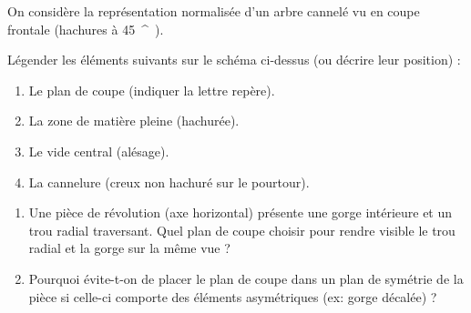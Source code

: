 \documentclass[11pt]{article}
\providecommand{\degree}{^{\circ}}
\begin{document}
\begin{exercice}
\begin{minipage}{\linewidth}
On considère la représentation normalisée d'un arbre cannelé vu en coupe frontale (hachures à \SI{45}{\degree}).
\begin{center}
\end{center}
Légender les éléments suivants sur le schéma ci-dessus (ou décrire leur position) :
\begin{enumerate}
    \item Le plan de coupe (indiquer la lettre repère).
    \item La zone de matière pleine (hachurée).
    \item Le vide central (alésage).
    \item La cannelure (creux non hachuré sur le pourtour).
\end{enumerate}
\end{minipage}
\end{exercice}

\begin{exercice}
\begin{enumerate}
    \item Une pièce de révolution (axe horizontal) présente une gorge intérieure et un trou radial traversant. Quel plan de coupe choisir pour rendre visible le trou radial et la gorge sur la même vue ?
    \underline{\hspace{10cm}}
    \item Pourquoi évite-t-on de placer le plan de coupe dans un plan de symétrie de la pièce si celle-ci comporte des éléments asymétriques (ex: gorge décalée) ?
    \underline{\hspace{10cm}}
\end{enumerate}
\end{exercice}
\end{document}

